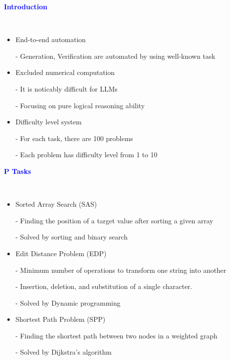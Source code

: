 \documentclass[professionalfont]{beamer}
\begin{document}
\begin{frame}
\begin{center}
    { \textbf{\textcolor{blue}{ {\fontsize{12}{14}\selectfont Introduction} }} }
\end{center}
\\[0.5cm]

{\fontsize{10}{14}\selectfont 
\begin{itemize}
    \item End-to-end automation

    - Generation, Verification are automated by using well-known task

    \item Excluded numerical computation

    - It is noticably difficult for LLMs
    
    - Focusing on pure logical reasoning ability

    \item Difficulty level system

    - For each task, there are 100 problems

    - Each problem has difficulty level from 1 to 10
\end{itemize}
}

\end{frame}

\begin{frame}
\begin{center}
    { \textbf{\textcolor{blue}{ {\fontsize{12}{14}\selectfont P Tasks} }} }
\end{center}
\\[0.5cm]

{\fontsize{10}{14}\selectfont 
\begin{itemize}
    \item Sorted Array Search (SAS)
    
    - Finding the position of a target value after sorting a given array

    - Solved by sorting and binary search

    \item Edit Distance Problem (EDP)
    
    - Minimum number of operations to transform one string into another

    - Insertion, deletion, and substitution of a single character.

    - Solved by Dynamic programming

    \item Shortest Path Problem (SPP)
    
    - Finding the shortest path between two nodes in a weighted graph

    - Solved by Dijkstra’s algorithm
\end{itemize}
}

\end{frame}
\end{document}
